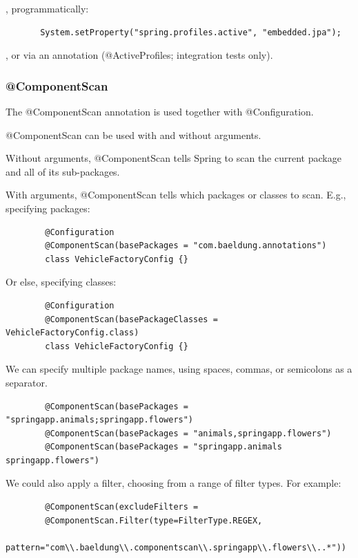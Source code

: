 \documentclass{scrartcl}
\begin{document}
   , programmatically:

   \begin{lstlisting}
       System.setProperty("spring.profiles.active", "embedded.jpa");
   \end{lstlisting}

   , or via an annotation (@ActiveProfiles; integration tests only).


\subsubsection{@ComponentScan}

    The @ComponentScan annotation is used together with @Configuration.

    @ComponentScan can be used with and without arguments.

    Without arguments, @ComponentScan  tells Spring to scan the current package and all of its sub-packages.

    With arguments, @ComponentScan tells which packages or classes to scan. E.g., specifying packages:

    \begin{lstlisting}
        @Configuration
        @ComponentScan(basePackages = "com.baeldung.annotations")
        class VehicleFactoryConfig {}
    \end{lstlisting}

    Or else, specifying classes:

    \begin{lstlisting}
        @Configuration
        @ComponentScan(basePackageClasses = VehicleFactoryConfig.class)
        class VehicleFactoryConfig {}
    \end{lstlisting}

    We can specify multiple package names, using spaces, commas, or semicolons as a separator.

    \begin{lstlisting}
        @ComponentScan(basePackages = "springapp.animals;springapp.flowers")
        @ComponentScan(basePackages = "animals,springapp.flowers")
        @ComponentScan(basePackages = "springapp.animals springapp.flowers")
    \end{lstlisting}

    We could also apply a filter, choosing from a range of filter types. For example:

    \begin{lstlisting}
        @ComponentScan(excludeFilters =
        @ComponentScan.Filter(type=FilterType.REGEX,
        pattern="com\\.baeldung\\.componentscan\\.springapp\\.flowers\\..*"))
    \end{lstlisting}
\end{document}

